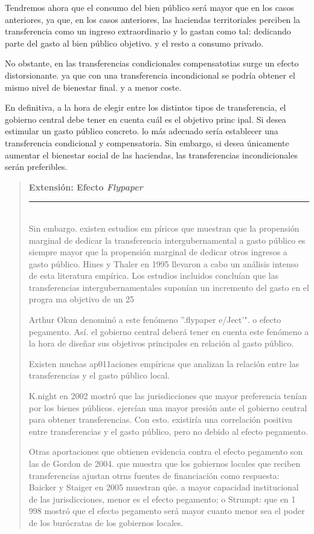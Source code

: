 \documentclass[10pt,a4paper]{article}
\newenvironment{specialblock}[1]{%
      \begin{quote} %
      \small %
      \noindent\textbf{#1}\\[-0.3em] %
      \rule{\linewidth}{0.4pt}\\[0.6em]}{
      \end{quote}}
\begin{document}
Tendremos ahora que el consumo del bien público será mayor que en los casos anteriores, ya que, en los casos anteriores, las haciendas territoriales perciben la transferencia como un ingreso extraordinario y lo gastan como tal: dedicando parte del gasto al bien público objetivo. y el resto a consumo privado.

No obstante, en las transferencias condicionales compensatotias surge un efecto distorsionante. ya que con una transferencia incondicional se podría obtener el mismo nivel de bienestar final. y a menor coste.

En definitiva, a la hora de elegir entre los distintos tipos de transferencia, el gobierno central debe tener en cuenta cuál es el objetivo princ ipal. Si desea estimular un gasto público concreto. lo más adecuado sería establecer una transferencia condicional y compensatoria. Sin embargo, si desea únicamente aumentar el bienestar social de las haciendas, las transferencias incondicionales serán preferibles.

\begin{specialblock}{\textbf{Extensión:} Efecto \textit{Flypaper}}
    Sin embargo. existen estudios em píricos que muestran que la propensión marginal de dedicar la transferencia intergubernamental a gasto público es siempre mayor que la propensión marginal de dedicar otros ingresos a gasto público. Hines y Thaler en 1995 llevaron a cabo un análisis intenso de esta literatura empírica. Los estudios incluidos concluían que las transferencias intergubernamentales suponían un incremento del gasto en el progra ma objetivo de un 25%

    Arthur Okun denominó a este fenómeno ''.flypaper e/Ject'". o efecto pegamento. Así. el gobierno central deberá tener en cuenta este fenómeno a la hora de diseñar sus objetivos principales en relación al gasto público.
    
    Existen muchas ap011aciones empíricas que analizan la relación entre las transferencias y el gasto público local.
    
    K.night en 2002 mostró que las jurisdicciones que mayor preferencia tenían por los bienes públicos. ejercían una mayor presión ante el gobierno central para obtener transferencias. Con esto. existiría una correlación positiva entre transferencias y el gasto público, pero no debido al efecto pegamento.
    
    Otras aportaciones que obtienen evidencia contra el efecto pegamento son las de Gordon de 2004. que muestra que los gobiernos locales que reciben transferencias ajustan otrns fuentes de financiación como respuesta: Baicker y Staiger en 2005 muestran qúe. a mayor capacidad institucional de las jurisdicciones, menor es el efecto pegamento; o Strumpt: que en 1 998 mostró que el efecto pegamento será mayor cuanto menor sea el poder de los burócratas de los gobiernos locales.
\end{specialblock}
\end{document}
